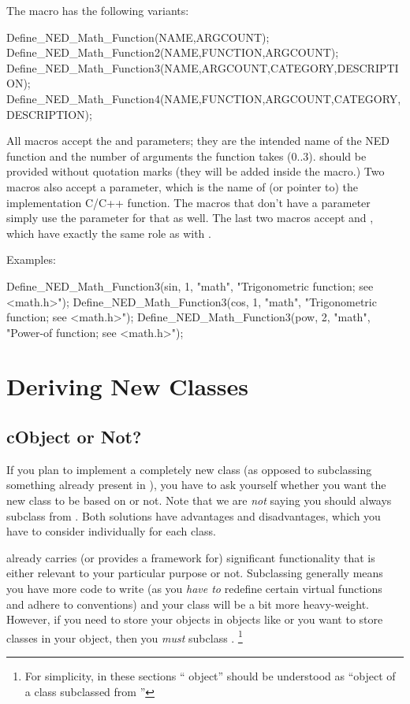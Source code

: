 The macro has the following variants:

\begin{cpp}
Define_NED_Math_Function(NAME,ARGCOUNT);
Define_NED_Math_Function2(NAME,FUNCTION,ARGCOUNT);
Define_NED_Math_Function3(NAME,ARGCOUNT,CATEGORY,DESCRIPTION);
Define_NED_Math_Function4(NAME,FUNCTION,ARGCOUNT,CATEGORY,DESCRIPTION);
\end{cpp}

All macros accept the  and  parameters; they are
the intended name of the NED function and the number of 
arguments the function takes (0..3).  should be provided without
quotation marks (they will be added inside the macro.) Two macros also
accept a  parameter, which is the name of (or pointer to) the
implementation C/C++ function. The macros that don't have a 
parameter simply use the  parameter for that as well. The last
two macros accept  and , which have exactly
the same role as with .

Examples:

\begin{cpp}
Define_NED_Math_Function3(sin, 1, "math", "Trigonometric function; see <math.h>");
Define_NED_Math_Function3(cos, 1, "math", "Trigonometric function; see <math.h>");
Define_NED_Math_Function3(pow, 2, "math", "Power-of function; see <math.h>");
\end{cpp}



\section{Deriving New Classes}
\label{sec:sim-lib:deriving-new-classes}

\subsection{cObject or Not?}
\label{sec:sim-lib:cobject-or-not}

If you plan to implement a completely new class (as opposed to
subclassing something already present in {\opp}), you have
to ask yourself whether you want the new class to be based
on  or not.
Note that we are \textit{not} saying you should always
subclass from .
Both solutions have advantages and disadvantages, which you
have to consider individually for each class.

 already carries (or provides a framework for)
significant functionality that is either relevant to
your particular purpose or not. Subclassing 
generally means you have more code to write (as you \textit{have to}
redefine certain virtual functions and adhere to conventions)
and your class will be a bit more heavy-weight.
However, if you need to store your objects in {\opp} objects like 
or you want to store {\opp} classes in your object,
then you \textit{must} subclass .
  \footnote{For simplicity, in these sections ``{\opp} object''
  should be understood as ``object of a class subclassed from
  ''}

